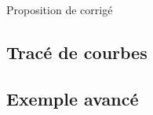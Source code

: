 
\vspace{0.1cm}
\begin{huge}
 Proposition de corrigé
\end{huge}

\subsection{Tracé de courbes}
\setcounter{thequestion}{0}
\subsection{Exemple avancé}
\setcounter{thequestion}{0}
